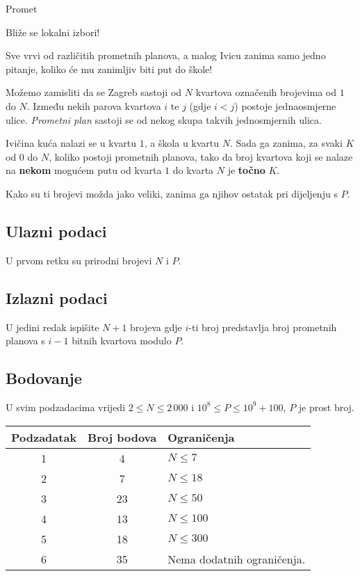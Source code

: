 \begin{statement}[
  problempoints=100,
  timelimit=1 sekunda,
  memorylimit=1024 MiB,
]{Promet}\

Bliže se lokalni izbori!

Sve vrvi od različitih prometnih planova, a malog Ivicu zanima samo jedno pitanje, koliko će mu zanimljiv biti put do škole!

Možemo zamisliti da se Zagreb sastoji od $N$ kvartova označenih brojevima od $1$ do $N$. Između nekih parova kvartova $i$ te $j$ (gdje $i < j$) postoje jednaosmjerne ulice. \textit{Prometni plan} sastoji se od nekog skupa takvih jednosmjernih ulica. 

Ivičina kuća nalazi se u kvartu $1$, a škola u kvartu $N$. Sada ga zanima, za svaki $K$ od $0$ do $N$, koliko postoji prometnih planova, tako da broj kvartova koji se nalaze na \textbf{nekom} mogućem putu od kvarta $1$ do kvarta $N$ je \textbf{točno} $K$.

Kako su ti brojevi možda jako veliki, zanima ga njihov ostatak pri dijeljenju s $P$.


\subsection*{Ulazni podaci}

U prvom retku su prirodni brojevi $N$ i $P$.

\subsection*{Izlazni podaci}

U jedini redak ispišite $N + 1$ brojeva gdje $i$-ti broj predstavlja broj prometnih planova s $i - 1$ bitnih kvartova modulo $P$.

\subsection*{Bodovanje}

U svim podzadacima vrijedi $2 \leq N \leq 2\,000$ i $10^8 \leq P \leq 10^9 + 100$, $P$ je prost broj.

{\renewcommand{\arraystretch}{1.4}
  \setlength{\tabcolsep}{6pt}
  \begin{tabular}{ccl}
   Podzadatak & Broj bodova & Ograničenja \\ \midrule
   	1 & 4 & $N \leq 7$ \\
    2 & 7 & $N \leq 18$ \\
    3 & 23 & $N \leq 50$ \\
    4 & 13 & $N \leq 100$ \\
    5 & 18 & $N \leq 300$ \\
    6 & 35 & Nema dodatnih ograničenja. \\
\end{tabular}}


\end{statement}
